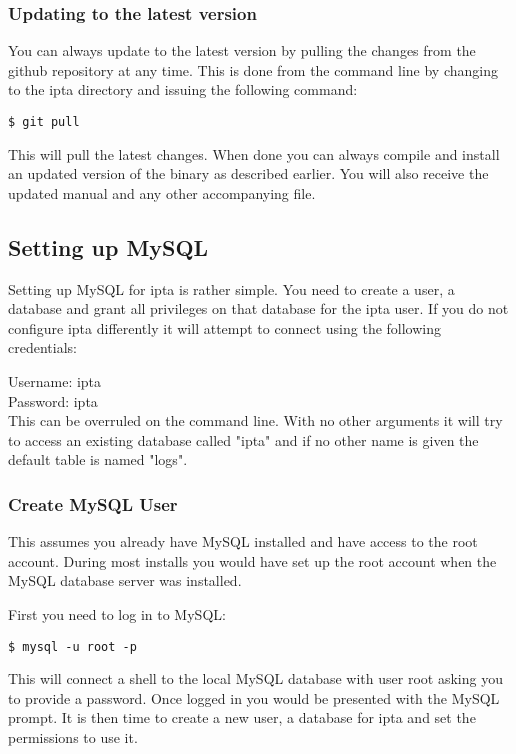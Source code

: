 \documentclass[english,twoside,openright,a4paper,12pt]{article}
\begin{document}
\subsubsection{Updating to the latest version}

You can always update to the latest version by pulling the changes
from the github repository at any time. This is done from the command
line by changing to the ipta directory and issuing the following
command:

\begin{verbatim} 
$ git pull 
\end{verbatim}

This will pull the latest changes. When done you can always compile
and install an updated version of the binary as described earlier. You
will also receive the updated manual and any other accompanying file.

\subsection{Setting up MySQL}

Setting up MySQL for ipta is rather simple. You need to create a user,
a database and grant all privileges on that database for the ipta
user. If you do not configure ipta differently it will attempt to
connect using the following credentials:

Username: ipta\\
Password: ipta\\

This can be overruled on the command line. With no other arguments it
will try to access an existing database called "ipta" and if no
other name is given the default table is named "logs".

\subsubsection{Create MySQL User}

This assumes you already have MySQL installed and have access to the
root account. During most installs you would have set up the root
account when the MySQL database server was installed.

First you need to log in to MySQL:

\begin{verbatim}
$ mysql -u root -p
\end{verbatim}

This will connect a shell to the local MySQL database with user root
asking you to provide a password. Once logged in you would be
presented with the MySQL prompt. It is then time to create a new user,
a database for ipta and set the permissions to use it.
\end{document}
